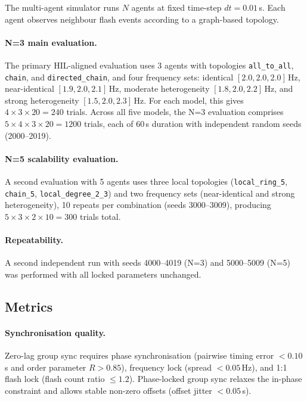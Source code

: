 \documentclass[11pt,a4paper]{article}
\begin{document}
The multi-agent simulator runs $N$ agents at fixed time-step $dt = 0.01$\,s.
Each agent observes neighbour flash events according to a graph-based topology.

\paragraph{N=3 main evaluation.}
The primary HIL-aligned evaluation uses 3 agents with topologies
\texttt{all\_to\_all}, \texttt{chain}, and \texttt{directed\_chain}, and four
frequency sets: identical $[2.0, 2.0, 2.0]$\,Hz, near-identical
$[1.9, 2.0, 2.1]$\,Hz, moderate heterogeneity $[1.8, 2.0, 2.2]$\,Hz, and
strong heterogeneity $[1.5, 2.0, 2.3]$\,Hz.  For each model, this gives
$4 \times 3 \times 20 = 240$ trials.  Across all five models, the N=3
evaluation comprises $5 \times 4 \times 3 \times 20 = 1200$ trials, each
of 60\,s duration with independent random seeds (2000--2019).

\paragraph{N=5 scalability evaluation.}
A second evaluation with 5 agents uses three local topologies
(\texttt{local\_ring\_5}, \texttt{chain\_5}, \texttt{local\_degree\_2\_3})
and two frequency sets (near-identical and strong heterogeneity), 10 repeats
per combination (seeds 3000--3009), producing $5 \times 3 \times 2 \times 10
= 300$ trials total.

\paragraph{Repeatability.}
A second independent run with seeds 4000--4019 (N=3) and 5000--5009 (N=5)
was performed with all locked parameters unchanged.

\subsection{Metrics}

\paragraph{Synchronisation quality.}
Zero-lag group sync requires phase synchronisation (pairwise timing error
$< 0.10$\,s and order parameter $R > 0.85$), frequency lock (spread
$< 0.05$\,Hz), and 1:1 flash lock (flash count ratio $\leq 1.2$).
Phase-locked group sync relaxes the in-phase constraint and allows stable
non-zero offsets (offset jitter $< 0.05$\,s).
\end{document}
